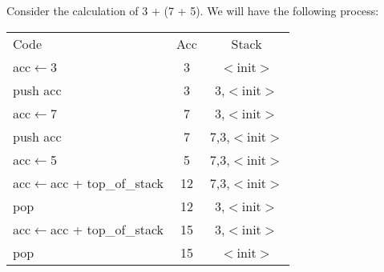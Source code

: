 Consider the calculation of 3 + (7 + 5). We will have the following process:
\begin{table}[ht]
\centering
\begin{tabular}{lcc}
Code & Acc & Stack\\
acc$\leftarrow$3 & 3 & $<$init$>$\\
push acc & 3 & 3,$<$init$>$\\
acc$\leftarrow$7 & 7 & 3,$<$init$>$\\
push acc & 7 & 7,3,$<$init$>$\\
acc$\leftarrow$5 & 5 & 7,3,$<$init$>$\\
acc$\leftarrow$acc + top\_of\_stack & 12 & 7,3,$<$init$>$\\
pop & 12 & 3,$<$init$>$\\
acc$\leftarrow$acc + top\_of\_stack & 15 & 3,$<$init$>$\\
pop & 15 & $<$init$>$
\end{tabular}

\end{table}
\ifx\PREAMBLE\undefined

\fi